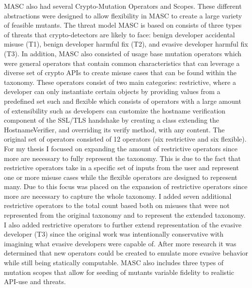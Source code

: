 MASC also had several Crypto-Mutation Operators and Scopes. These different abstractions were designed to allow flexibility in MASC to create a large variety of feasible mutants. The threat model MASC is based on consists of three types of threats that crypto-detectors are likely to face: benign developer accidental misuse (T1), benign developer harmful fix (T2), and evasive developer harmful fix (T3). In addition, MASC also consisted of usage base mutation operators which were general operators that contain common characteristics that can leverage a diverse set of crypto APIs to create misuse cases that can be found within the taxonomy. These operators consist of two main categories: restrictive, where a developer can only instantiate certain objects by providing values from a predefined set such  and flexible which consists of operators with a large amount of extensibility such as developers can customize the hostname verification component of the SSL/TLS handshake by creating a class extending the HostnameVerifier, and overriding its verify method, with any content. The original set of operators consisted of 12 operators (six restrictive and six flexible). For my thesis I focused on expanding the amount of restrictive operators since more are necessary to fully represent the taxonomy.  This is due to the fact that restrictive operators take in a specific set of inputs from the user and represent one or more misuse cases while the flexible operators are designed to represent many. Due to this focus was placed on the expansion of restrictive operators since more are necessary to capture the whole taxonomy. I added seven  additional restrictive operators to the total count based both on misuses that were not represented from the original taxonomy and to represent the extended taxonomy. I also added restrictive operators to further extend representation of the evasive developer (T3) since the original work was intentionally conservative with imagining what evasive developers were capable of. After more research it was determined that new operators could be created to emulate more evasive behavior while still being statically computable. MASC also includes three types of mutation scopes that allow for seeding of mutants variable fidelity to realistic API-use and threats.

